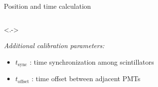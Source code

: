 \documentclass[compress, 13pt, aspectratio=169]{beamer}
\begin{document}
\begin{frame}[t]{Position and time calculation}
\begin{columns}[t]
\begin{column}{0.48 \textwidth}
			\onslide<.->{ \small
				\textit{Additional calibration parameters:}
				\begin{itemize}
					\item \alert{$t_\text{sync}$} : time synchronization among scintillators \\
					\item<+-> \alert{$t_\text{offset}$} : time offset between adjacent PMTs
				\end{itemize}

			}

			\vspace{0.5cm}
		\end{column}
	\end{columns}
\end{frame}
\end{document}
